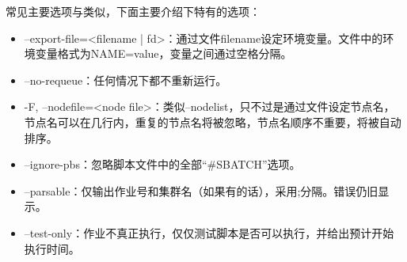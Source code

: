 常见主要选项与类似，下面主要介绍下特有的选项：
\begin{itemize}
	\item --export-file=<filename | fd>：通过文件filename设定环境变量。文件中的环境变量格式为NAME=value，变量之间通过空格分隔。
	\item --no-requeue：任何情况下都不重新运行。
	\item -F, --nodefile=<node file>：类似--nodelist，只不过是通过文件设定节点名，节点名可以在几行内，重复的节点名将被忽略，节点名顺序不重要，将被自动排序。
	\item --ignore-pbs：忽略脚本文件中的全部``\#SBATCH''选项。
	\item --parsable：仅输出作业号和集群名（如果有的话），采用;分隔。错误仍旧显示。
	\item --test-only：作业不真正执行，仅仅测试脚本是否可以执行，并给出预计开始执行时间。
\end{itemize}

